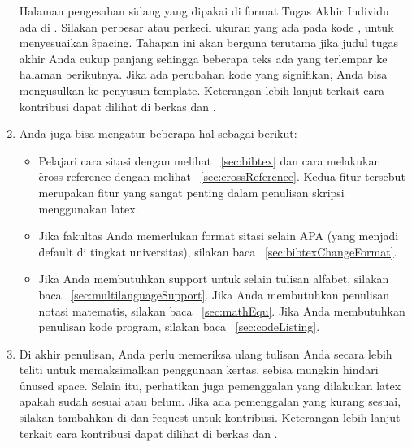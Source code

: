 \begin{enumerate}
	Halaman pengesahan sidang yang dipakai di format Tugas Akhir Individu ada di .
	Silakan perbesar atau perkecil ukuran yang ada pada kode , untuk menyesuaikan \f{spacing}.
	Tahapan ini akan berguna terutama jika judul tugas akhir Anda cukup panjang sehingga beberapa teks ada yang terlempar ke halaman berikutnya.
	Jika ada perubahan kode yang signifikan, Anda bisa mengusulkan ke penyusun \f{template}.
	Keterangan lebih lanjut terkait cara kontribusi dapat dilihat di berkas  dan .
	\item Anda juga bisa mengatur beberapa hal sebagai berikut:
	\begin{itemize}
		\item Pelajari cara sitasi dengan melihat \sect~\ref{sec:bibtex} dan cara melakukan \f{cross-reference} dengan melihat \sect~\ref{sec:crossReference}.
		Kedua fitur tersebut merupakan fitur yang sangat penting dalam penulisan skripsi menggunakan \gls{latex}.
		\item Jika fakultas Anda memerlukan format sitasi selain APA (yang menjadi \f{default} di tingkat universitas), silakan baca \sect~\ref{sec:bibtexChangeFormat}.
		\item Jika Anda membutuhkan support untuk selain tulisan alfabet, silakan baca \sect~\ref{sec:multilanguageSupport}.
		Jika Anda membutuhkan penulisan notasi matematis, silakan baca \sect~\ref{sec:mathEqu}.
		Jika Anda membutuhkan penulisan kode program, silakan baca \sect~\ref{sec:codeListing}.
	\end{itemize}
	\item Di akhir penulisan, Anda perlu memeriksa ulang tulisan Anda secara lebih teliti untuk memaksimalkan penggunaan kertas, sebisa mungkin hindari \f{unused space}. Selain itu, perhatikan juga pemenggalan yang dilakukan \gls{latex} apakah sudah sesuai atau belum. Jika ada pemenggalan yang kurang sesuai, silakan tambahkan di  dan \f{request} untuk kontribusi.
	Keterangan lebih lanjut terkait cara kontribusi dapat dilihat di berkas  dan .
\end{enumerate}

